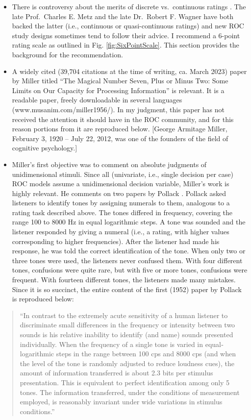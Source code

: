 \documentclass[
]{book}
\begin{document}
\begin{itemize}
\item
  There is controversy about the merits of discrete vs.~continuous ratings \citep{rockette1992use, wagner2001continuous}. The late Prof.~Charles E. Metz and the late Dr.~Robert F. Wagner have both backed the latter (i.e., continuous or quasi-continuous ratings) and new ROC study designs sometimes tend to follow their advice. I recommend a 6-point rating scale as outlined in Fig. \ref{fig:SixPointScale}. This section provides the background for the recommendation.
\item
  A widely cited (39,704 citations at the time of writing, ca. March 2023) paper by Miller \citep{miller1956magical} titled ``The Magical Number Seven, Plus or Minus Two: Some Limits on Our Capacity for Processing Information'' is relevant. It is a readable paper, freely downloadable in several languages (www.musanim.com/miller1956/). In my judgment, this paper has not received the attention it should have in the ROC community, and for this reason portions from it are reproduced below. {[}George Armitage Miller, February 3, 1920 -- July 22, 2012, was one of the founders of the field of cognitive psychology.{]}
\item
  Miller's first objective was to comment on absolute judgments of unidimensional stimuli. Since all (univariate, i.e., single decision per case) ROC models assume a unidimensional decision variable, Miller's work is highly relevant. He comments on two papers by Pollack \citep{pollack1952information, pollack1953information}. Pollack asked listeners to identify tones by assigning numerals to them, analogous to a rating task described above. The tones differed in frequency, covering the range 100 to 8000 Hz in equal logarithmic steps. A tone was sounded and the listener responded by giving a numeral (i.e., a rating, with higher values corresponding to higher frequencies). After the listener had made his response, he was told the correct identification of the tone. When only two or three tones were used, the listeners never confused them. With four different tones, confusions were quite rare, but with five or more tones, confusions were frequent. With fourteen different tones, the listeners made many mistakes. Since it is so succinct, the entire content of the first (1952) paper by Pollack is reproduced below:
\end{itemize}

\begin{quote}
``In contrast to the extremely acute sensitivity of a human listener to discriminate small differences in the frequency or intensity between two sounds is his relative inability to identify (and name) sounds presented individually. When the frequency of a single tone is varied in equal‐logarithmic steps in the range between 100 cps and 8000 cps (and when the level of the tone is randomly adjusted to reduce loudness cues), the amount of information transferred is about 2.3 bits per stimulus presentation. This is equivalent to perfect identification among only 5 tones. The information transferred, under the conditions of measurement employed, is reasonably invariant under wide variations in stimulus conditions.''
\end{quote}
\end{document}
